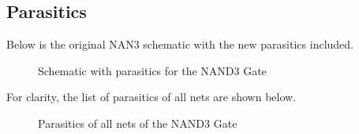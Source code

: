 \documentclass[12pt]{article}
\begin{document}
\subsection{Parasitics}
Below is the original NAN3 schematic with the new parasitics included.
\begin{figure} [H]
    \centering
    \caption{Schematic with parasitics for the NAND3 Gate}
\end{figure}
For clarity, the list of parasitics of all nets are shown below.
\begin{figure} [H]
    \centering
    \caption{Parasitics of all nets of the NAND3 Gate}
\end{figure}
\end{document}
